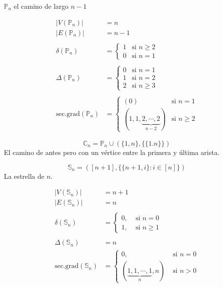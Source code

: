 \documentclass[../main.tex]{subfiles}
\begin{document}
$\mathbb{P}_n$ el camino de largo $n-1$

\begin{figure}[H]
	\centering
	
\end{figure}

\begin{align*}
	|V(\mathbb{P}_n)| &= n\\
	|E(\mathbb{P}_n)| &= n-1\\
	\\
	\delta(\mathbb{P}_n) &=
	\begin{cases}
		1 &\text{si } n \geq 2\\
		0 &\text{si } n = 1
	\end{cases}\\
	\\
	\Delta(\mathbb{P}_n) &=
	\begin{cases}
		0 &\text{si } n = 1\\
		1 &\text{si } n = 2\\
		2 &\text{si } n \geq 3
	\end{cases}\\
	\\
	\text{sec.grad}(\mathbb{P}_n) &=
	\begin{cases}
		(0) &\text{si }n=1\\
		(1,1,
		\underbrace
		{
			2,\cdots,2
		}_
		{
			n-2
		}
		) &\text{si }n \geq 2
	\end{cases}
\end{align*}

\[
	\mathbb{C}_n = \mathbb{P}_n\cup
	(
		\{1,n\},
		\{\{1.n\}\}
	)
\]
El camino de antes pero con un vértice entre la primera y última arista.

\begin{figure}[H]
	\centering
	
\end{figure}

\[
	\mathbb{S}_n =
	(
		[n+1],
		\{
			\{n+1,i\}:
			i\in[n]
		\}
	)
\]
La estrella de $n$.

\begin{figure}[H]
	\centering
	
\end{figure}

\begin{align*}
	|V(\mathbb{S}_n)| &= n+1\\
	|E(\mathbb{S}_n)| &= n\\
	\\
	\delta(\mathbb{S}_n) &=
	\begin{cases}
		0, &\text{ si }n=0\\
		1, &\text{ si }n\geq1
	\end{cases}\\
	\\
	\Delta(\mathbb{S}_n) &= n\\
	\text{sec.grad}(\mathbb{S}_n) &=
	\begin{cases}
		0, &\text{ si }n=0\\
		(
		\underbrace
		{
			1,1,\cdots,1
		}_
		{
			n
		}
		,n) &\text{ si } n > 0
	\end{cases}
\end{align*}
\end{document}
